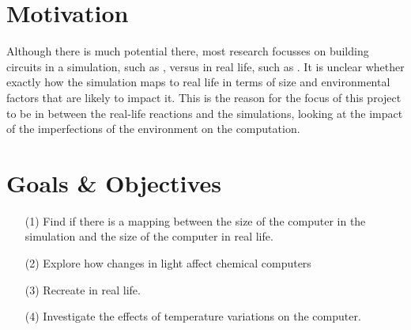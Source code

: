 \section{Motivation}
Although there is much potential there, most research focusses on building circuits in a simulation, such as \cite{StovoldJames2019RaGI}, versus in real life, such as \cite{gorecki2003chemical}. It is unclear whether exactly how the simulation maps to real life in terms of size and environmental factors that are likely to impact it. 
This is the reason for the focus of this project to be in between the real-life reactions and the simulations, looking at the impact of the imperfections of the environment on the computation.


\section{Goals \& Objectives} \label{sec:goals-lit-review}

\begin{enumerate}
    \item[(1)] Find if there is a mapping between the size of the computer in the simulation and the size of the computer in real life.
    \item[(2)] Explore how changes in light affect chemical computers
    \item[(3)] Recreate \cite{stovold2017reaction} in real life.
    \item[(4)] Investigate the effects of temperature variations on the computer.
\end{enumerate}
